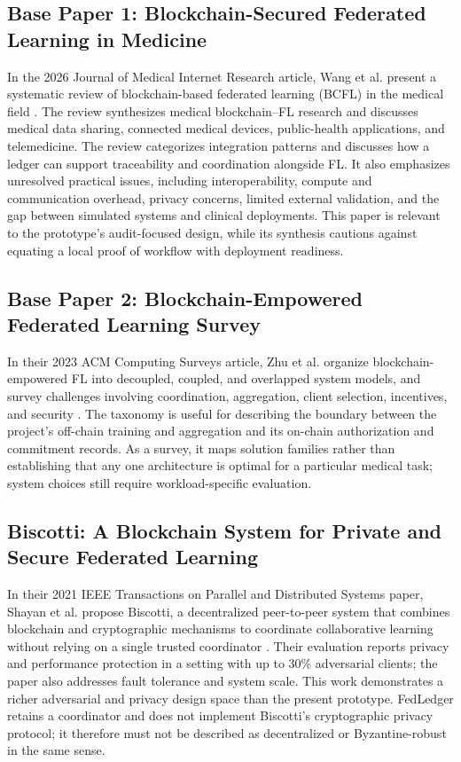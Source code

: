\documentclass[12pt,a4paper]{report}
\begin{document}
\subsection{Base Paper 1: Blockchain-Secured Federated Learning in Medicine}
In the 2026 Journal of Medical Internet Research article, Wang et al. present a systematic review of blockchain-based federated learning (BCFL) in the medical field \cite{wang2026bcfl}. The review synthesizes medical blockchain--FL research and discusses medical data sharing, connected medical devices, public-health applications, and telemedicine. The review categorizes integration patterns and discusses how a ledger can support traceability and coordination alongside FL. It also emphasizes unresolved practical issues, including interoperability, compute and communication overhead, privacy concerns, limited external validation, and the gap between simulated systems and clinical deployments. This paper is relevant to the prototype's audit-focused design, while its synthesis cautions against equating a local proof of workflow with deployment readiness.

\subsection{Base Paper 2: Blockchain-Empowered Federated Learning Survey}
In their 2023 ACM Computing Surveys article, Zhu et al. organize blockchain-empowered FL into decoupled, coupled, and overlapped system models, and survey challenges involving coordination, aggregation, client selection, incentives, and security \cite{zhu2023blockfed}. The taxonomy is useful for describing the boundary between the project's off-chain training and aggregation and its on-chain authorization and commitment records. As a survey, it maps solution families rather than establishing that any one architecture is optimal for a particular medical task; system choices still require workload-specific evaluation.

\subsection{Biscotti: A Blockchain System for Private and Secure Federated Learning}
In their 2021 IEEE Transactions on Parallel and Distributed Systems paper, Shayan et al. propose Biscotti, a decentralized peer-to-peer system that combines blockchain and cryptographic mechanisms to coordinate collaborative learning without relying on a single trusted coordinator \cite{shayan2021biscotti}. Their evaluation reports privacy and performance protection in a setting with up to 30\% adversarial clients; the paper also addresses fault tolerance and system scale. This work demonstrates a richer adversarial and privacy design space than the present prototype. FedLedger retains a coordinator and does not implement Biscotti's cryptographic privacy protocol; it therefore must not be described as decentralized or Byzantine-robust in the same sense.
\end{document}
